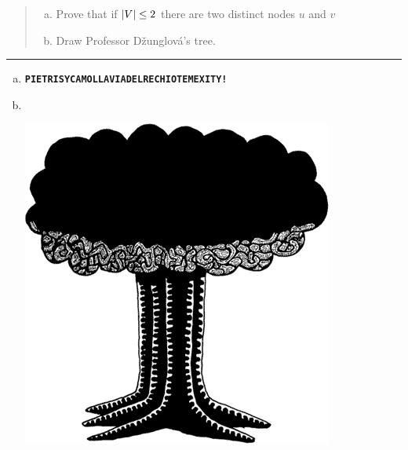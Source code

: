\documentclass[11pt]{article}
\def\Sym#1{\textbf{\texttt{\color{BrickRed}#1}}}
\begin{document}



\begin{quote}
\begin{enumerate}[(a)]
\item
 Prove that if  $\mathopen| V \mathclose| \leq 2$ there are two distinct nodes $u$ and $v$ 

\item
Draw Professor Džunglová’s tree.

\end{enumerate}
\end{quote}
\hrule



\begin{solution}
\begin{enumerate}[(a)]
\item 
\Sym{PIETRISYCAMOLLAVIADELRECHIOTEMEXITY!}

\item ~%

\begin{center}
\includegraphics[scale=0.5]{Fig/GranMaPa} %
\end{center}

\end{enumerate}
\end{solution}




\end{document}
